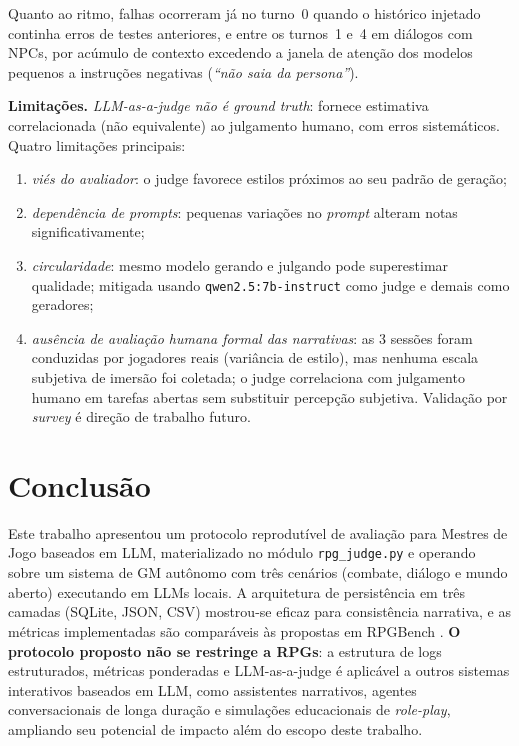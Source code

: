 \documentclass[12pt]{article}
\begin{document}
Quanto ao ritmo, falhas ocorreram já no turno~0 quando o histórico injetado continha erros de testes anteriores, e entre os turnos~1 e~4 em diálogos com NPCs, por acúmulo de contexto excedendo a janela de atenção dos modelos pequenos a instruções negativas (\textit{``não saia da persona''}).

\textbf{Limitações.} \textit{LLM-as-a-judge não é \textit{ground truth}}: fornece estimativa correlacionada (não equivalente) ao julgamento humano, com erros sistemáticos. Quatro limitações principais:

\begin{enumerate}[label=(\arabic*),leftmargin=2.4em,itemsep=2pt]
  \item \textit{viés do avaliador}: o judge favorece estilos próximos ao seu padrão de geração;
  \item \textit{dependência de prompts}: pequenas variações no \textit{prompt} alteram notas significativamente;
  \item \textit{circularidade}: mesmo modelo gerando e julgando pode superestimar qualidade; mitigada usando \texttt{qwen2.5:7b-instruct} como judge e demais como geradores;
  \item \textit{ausência de avaliação humana formal das narrativas}: as 3 sessões foram conduzidas por jogadores reais (variância de estilo), mas nenhuma escala subjetiva de imersão foi coletada; o judge correlaciona com julgamento humano em tarefas abertas \cite{zheng:2023} sem substituir percepção subjetiva. Validação por \textit{survey} é direção de trabalho futuro.
\end{enumerate}

\section{Conclusão}

Este trabalho apresentou um protocolo reprodutível de avaliação para Mestres de Jogo baseados em LLM, materializado no módulo \texttt{rpg\_judge.py} e operando sobre um sistema de GM autônomo com três cenários (combate, diálogo e mundo aberto) executando em LLMs locais. A arquitetura de persistência em três camadas (SQLite, JSON, CSV) mostrou-se eficaz para consistência narrativa, e as métricas implementadas são comparáveis às propostas em RPGBench \cite{yu:2025}. \textbf{O protocolo proposto não se restringe a RPGs}: a estrutura de logs estruturados, métricas ponderadas e LLM-as-a-judge é aplicável a outros sistemas interativos baseados em LLM, como assistentes narrativos, agentes conversacionais de longa duração e simulações educacionais de \textit{role-play}, ampliando seu potencial de impacto além do escopo deste trabalho.
\end{document}
